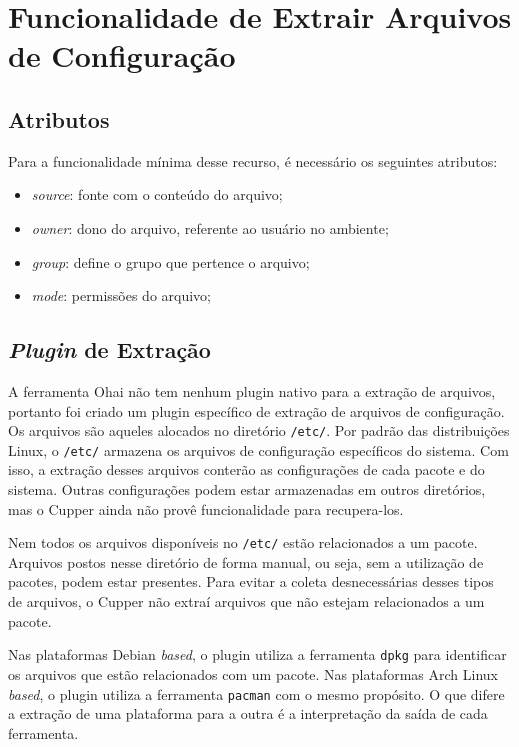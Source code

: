 \section{Funcionalidade de Extrair Arquivos de Configuração}
\label{sec:files}

\subsection{Atributos}

Para a funcionalidade mínima desse recurso, é necessário os seguintes
atributos:

\begin{itemize}
  \item \textit{source}: fonte com o conteúdo do arquivo;
  \item \textit{owner}: dono do arquivo, referente ao usuário no ambiente;
  \item \textit{group}: define o grupo que pertence o arquivo;
  \item \textit{mode}: permissões do arquivo;
\end{itemize}

\subsection{\textit{Plugin} de Extração}

A ferramenta Ohai não tem nenhum plugin nativo para a extração de arquivos, portanto
foi criado um plugin específico de extração de arquivos de configuração. Os arquivos
são aqueles alocados no diretório \texttt{/etc/}. Por padrão das distribuições Linux,
o \texttt{/etc/} armazena os arquivos de configuração específicos do sistema.
Com isso, a extração desses arquivos conterão as configurações de cada pacote e do
sistema. Outras configurações podem estar armazenadas em outros diretórios,
mas o Cupper ainda não provê funcionalidade para recupera-los. %

Nem todos os arquivos disponíveis no \texttt{/etc/} estão relacionados a um pacote.
Arquivos postos nesse diretório de forma manual, ou seja, sem a utilização de pacotes,
podem estar presentes. Para evitar a coleta desnecessárias desses tipos de arquivos,
o Cupper não extraí arquivos que não estejam relacionados a um pacote.

Nas plataformas Debian \textit{based}, o plugin utiliza a ferramenta \texttt{dpkg}
para identificar os arquivos que estão relacionados com um pacote. Nas plataformas
Arch Linux \textit{based}, o plugin utiliza a ferramenta \texttt{pacman} com o mesmo propósito.
O que difere a extração de uma plataforma para a outra é a interpretação da saída
de cada ferramenta.

